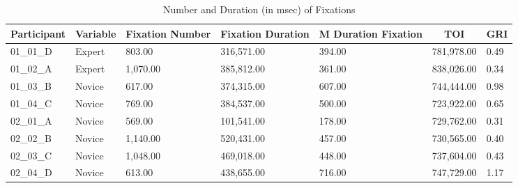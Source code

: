 \documentclass[
  english,
  man,floatsintext]{apa6}
\begin{document}
\begin{table}[h]

\begin{center}
\begin{threeparttable}

\caption{\label{tab:GRItable}Number and Duration (in msec) of Fixations}

\scriptsize{

\begin{tabular}{lllllll}
\toprule
Participant & \multicolumn{1}{c}{Variable} & \multicolumn{1}{c}{Fixation Number} & \multicolumn{1}{c}{Fixation Duration} & \multicolumn{1}{c}{M Duration Fixation} & \multicolumn{1}{c}{TOI} & \multicolumn{1}{c}{GRI}\\
\midrule
01\_01\_D & Expert & 803.00 & 316,571.00 & 394.00 & 781,978.00 & 0.49\\
01\_02\_A & Expert & 1,070.00 & 385,812.00 & 361.00 & 838,026.00 & 0.34\\
01\_03\_B & Novice & 617.00 & 374,315.00 & 607.00 & 744,444.00 & 0.98\\
01\_04\_C & Novice & 769.00 & 384,537.00 & 500.00 & 723,922.00 & 0.65\\
02\_01\_A & Novice & 569.00 & 101,541.00 & 178.00 & 729,762.00 & 0.31\\
02\_02\_B & Novice & 1,140.00 & 520,431.00 & 457.00 & 730,565.00 & 0.40\\
02\_03\_C & Novice & 1,048.00 & 469,018.00 & 448.00 & 737,604.00 & 0.43\\
02\_04\_D & Novice & 613.00 & 438,655.00 & 716.00 & 747,729.00 & 1.17\\
\bottomrule
\end{tabular}

}

\end{threeparttable}
\end{center}

\end{table}
\end{document}
